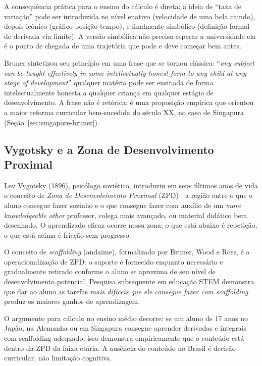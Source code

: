 \documentclass[12pt,a4paper,oneside]{article}
\begin{document}
A consequência prática para o ensino do cálculo é direta: a ideia
de ``taxa de variação'' pode ser introduzida no nível enativo
(velocidade de uma bola caindo), depois icônico (gráfico
posição-tempo), e finalmente simbólico (definição formal de
derivada via limite). A versão simbólica não precisa esperar a
universidade \textemdash{} ela é o ponto de chegada de uma
trajetória que pode e deve começar bem antes.

Bruner sintetizou seu princípio em uma frase que se tornou
clássica: ``\emph{any subject can be taught effectively in some
intellectually honest form to any child at any stage of
development}'' \cite{ref:bruner-1960} \textemdash{} qualquer
matéria pode ser ensinada de forma intelectualmente honesta a
qualquer criança em qualquer estágio de desenvolvimento. A frase
não é retórica: é uma proposição empírica que orientou a maior
reforma curricular bem-sucedida do século XX, no caso de Singapura
(Seção~\ref{sec:singapore-bruner}).

\subsection{Vygotsky e a Zona de Desenvolvimento Proximal}

Lev Vygotsky (1896), psicólogo soviético,
introduziu em seus últimos anos de vida o conceito de \emph{Zona de
Desenvolvimento Proximal} (ZPD) \cite{ref:vygotsky-1978}: a região
entre o que o aluno consegue fazer sozinho e o que consegue fazer
com auxílio de um \emph{more knowledgeable other} \textemdash{}
professor, colega mais avançado, ou material didático bem
desenhado. O aprendizado eficaz ocorre nessa zona; o que está
abaixo é repetição, o que está acima é fricção sem progresso.

O conceito de \emph{scaffolding} (andaime), formalizado por Bruner,
Wood e Ross, é a operacionalização de ZPD: o suporte é fornecido
enquanto necessário e gradualmente retirado conforme o aluno se
aproxima de seu nível de desenvolvimento potencial. Pesquisa
subsequente em educação STEM demonstra que dar ao aluno as tarefas
\emph{mais difíceis que ele consegue fazer com scaffolding} produz
os maiores ganhos de aprendizagem.

O argumento para cálculo no ensino médio decorre: se um aluno de
17 anos no Japão, na Alemanha ou em Singapura consegue aprender
derivadas e integrais com scaffolding adequado, isso demonstra
empiricamente que o conteúdo está dentro da ZPD da faixa etária. A
ausência do conteúdo no Brasil é decisão curricular, não limitação
cognitiva.
\end{document}
